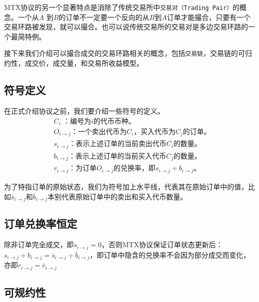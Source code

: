 \documentclass[UTF8,nofonts]{ctexart}
\begin{document}
MTX协议的另一个显著特点是消除了传统交易所中\texttt{交易对（Trading Pair）}的概念。一个从$A$ 到$B$的订单不一定要一个反向的从$B$到$A$订单才能撮合，只要有一个交易环路被发现，就可以撮合。也可以说传统交易所的交易对是多边交易环路的一个最简特例。

接下来我们介绍可以撮合成交的交易环路相关的概念，包括\texttt{交易链}，交易链的可归约性，成交价，成交量，和交易所收益模型。

\subsection{符号定义}

在正式介绍协议之前，我们要介绍一些符号的定义。
\[
\begin{split}
&C_{i}\text{ ：}\text{编号为$i$的代币币种。}\\
&O_{i\rightarrow j}\text{：}\text{一个卖出代币为$C_{i}$，买入代币为$C_{j}$的订单。}\\
&s_{i\rightarrow j}\text{：}\text{表示上述订单的当前卖出代币$C_{i}$的数量。}\\
&b_{i\rightarrow j}\text{：}\text{表示上述订单的当前买入代币$C_{j}$的数量。}\\
&r_{i\rightarrow j}\text{：}\text{为订单$O_{i\rightarrow j}$的兑换率，即$s_{i\rightarrow j} \div b_{i\rightarrow j}$。}
\end{split}
\]


为了特指订单的原始状态，我们为符号加上水平线，代表其在原始订单中的值，比如$\overline{s}_{i\rightarrow j}$和$\overline{b}_{i\rightarrow j}$本别代表原始订单中的卖出和买入代币数量。

\subsection{订单兑换率恒定\label{sec:consistrate}}

除非订单完全成交，即$s_{i\rightarrow j} = 0$，否则MTX协议保证订单状态更新后：
$s_{i\rightarrow j} \div b_{i\rightarrow j} = \overline{s}_{i\rightarrow j}\div \overline{b}_{i\rightarrow j}$，即订单中隐含的兑换率不会因为部分成交而变化，亦即$r_{i\rightarrow j} = \overline{r}_{i\rightarrow j}$

\subsection{可规约性\label{sec:reducability}}
\end{document}
